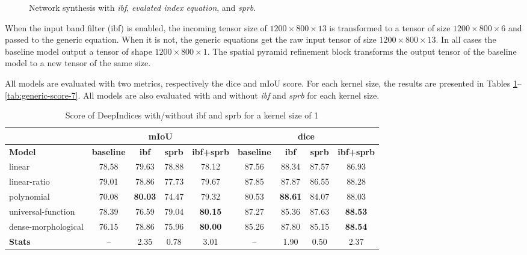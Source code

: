 \documentclass[../thesis.tex]{subfiles}
\begin{document}
	\begin{figure}[H]
		\centering
		
		\caption{ {Network} synthesis with \textit{ibf}, \textit{evalated index equation}, and \textit{sprb}.}
		\label{fig:network-synthesis}%
	\end{figure}
	
	When the input band filter (ibf) is enabled, the incoming tensor size of $1200 \times 800 \times 13$ is transformed to a tensor of size $1200 \times 800 \times 6$ and passed to the generic equation. When it is not, the generic equations get the raw input tensor of size $1200 \times 800 \times 13$. In all cases the baseline model output a tensor of shape $1200 \times 800 \times 1$. The spatial pyramid refinement block transforms the output tensor of the baseline model to a new tensor of the same size.
	
	All models are evaluated with two metrics, respectively the dice and mIoU score. For each kernel size, the results are presented in Tables \ref{tab:generic-score-1}--\ref{tab:generic-score-7}.
	All models are also evaluated with and without \textit{ibf} and \textit{sprb} for each kernel size.
	
	\begin{table}[H]
		\centering
		\small
		\begin{tabular} {|l| |c|c|c|c||c|c|c|c|}
			\hline & \multicolumn{4}{c||}{\textbf{mIoU}} & \multicolumn{4}{|c|}{\textbf{dice}} \\
			\hline \textbf{Model} & \textbf{baseline} &	\textbf{ibf} &	\textbf{sprb} &	\textbf{ibf+sprb}  &
									\textbf{baseline} &	\textbf{ibf} &	\textbf{sprb} &	\textbf{ibf+sprb}  \\ \hline
			linear &     78.58 &  79.63 &  78.88 &     78.12 &     87.56 &  88.34 &  87.57 &     86.93 \\
			linear-ratio &     79.01 &  78.86 &  77.73 &     79.67 &     87.85 &  87.87 &  86.55 &     88.28 \\
			polynomial &     70.08 &  \textbf{80.03} &  74.47 &     79.32 &     80.53 &  \textbf{88.61} &  84.07 &     88.03 \\
			universal-function &     78.39 &  76.59 &  79.04 &     \textbf{80.15} &     87.27 &  85.36 &  87.63 &     \textbf{88.53} \\
			dense-morphological &     76.15 &  78.86 &  75.96 &     \textbf{80.00} &     85.26 &  87.80 &  85.15 &     \textbf{88.54} \\ \hline
			\textbf{Stats} &       --  &   2.35 &   0.78 &      3.01 &       --  &   1.90 &   0.50 &      2.37 \\
			\hline
		\end{tabular}
		
		\caption{Score of DeepIndices with/without ibf and sprb for a kernel size of 1}
		\label{tab:generic-score-1}
	\end{table}
\end{document}
